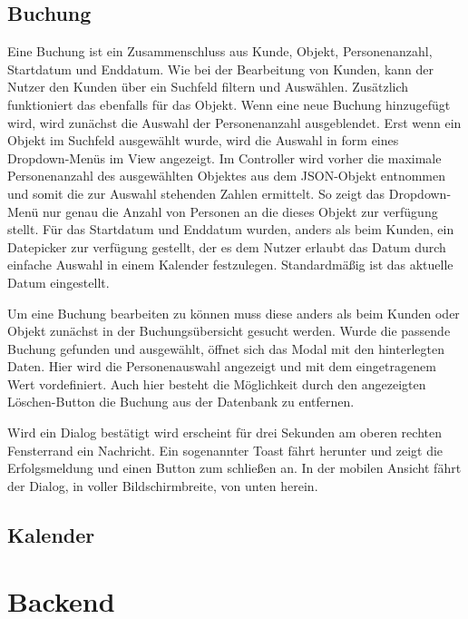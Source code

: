 \subsection{Buchung}
Eine Buchung ist ein Zusammenschluss aus Kunde, Objekt, Personenanzahl, Startdatum und Enddatum. Wie bei der Bearbeitung von Kunden, kann der Nutzer den Kunden über ein Suchfeld filtern und Auswählen. Zusätzlich funktioniert das ebenfalls für das Objekt.
Wenn eine neue Buchung hinzugefügt wird, wird zunächst die Auswahl der Personenanzahl ausgeblendet. Erst wenn ein Objekt im Suchfeld ausgewählt wurde, wird die Auswahl in form eines Dropdown-Menüs im View angezeigt. Im Controller wird vorher die maximale Personenanzahl des ausgewählten Objektes aus dem JSON-Objekt entnommen und somit die zur Auswahl stehenden Zahlen ermittelt. So zeigt das Dropdown-Menü nur genau die Anzahl von Personen an die dieses Objekt zur verfügung stellt. Für das Startdatum und Enddatum wurden, anders als beim Kunden, ein Datepicker zur verfügung gestellt, der es dem Nutzer erlaubt das Datum durch einfache Auswahl in einem Kalender festzulegen. Standardmäßig ist das aktuelle Datum eingestellt.

Um eine Buchung bearbeiten zu können muss diese anders als beim Kunden oder Objekt zunächst in der Buchungsübersicht gesucht werden. Wurde die passende Buchung gefunden und ausgewählt, öffnet sich das Modal mit den hinterlegten Daten. Hier wird die Personenauswahl angezeigt und mit dem eingetragenem Wert vordefiniert. Auch hier besteht die Möglichkeit durch den angezeigten Löschen-Button die Buchung aus der Datenbank zu entfernen.

Wird ein Dialog bestätigt wird erscheint für drei Sekunden am oberen rechten Fensterrand ein Nachricht. Ein sogenannter Toast fährt herunter und zeigt die Erfolgsmeldung und einen Button zum schließen an. In der mobilen Ansicht fährt der Dialog, in voller Bildschirmbreite, von unten herein.

\subsection{Kalender}

 
\section{Backend}
